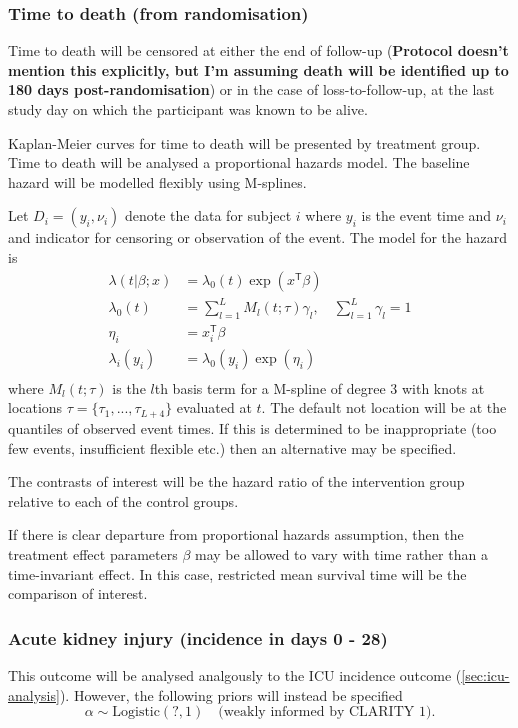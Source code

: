 \documentclass[11pt,parskip=half-]{scrartcl}
\begin{document}
\subsubsection{Time to death (from randomisation)}
Time to death will be censored at either the end of follow-up (\textbf{Protocol doesn't mention this explicitly, but I'm assuming death will be identified up to 180 days post-randomisation}) or in the case of loss-to-follow-up, at the last study day on which the participant was known to be alive.

Kaplan-Meier curves for time to death will be presented by treatment group. Time to death will be analysed a proportional hazards model. The baseline hazard will be modelled flexibly using M-splines.

Let $D_i = (y_i, \nu_i)$ denote the data for subject $i$ where $y_i$ is the event time and $\nu_i$ and indicator for censoring or observation of the event. The model for the hazard is
$$
    \begin{aligned}
        \lambda(t|\beta;x) & = \lambda_0(t)\exp(x^\mathsf{T}\beta)                           \\
        \lambda_0(t)       & = \sum_{l=1}^L M_l(t;\tau)\gamma_l,\quad \sum_{l=1}^L\gamma_l=1 \\
        \eta_i             & = x_i^\mathsf{T}\beta                                           \\
        \lambda_i(y_i)     & = \lambda_0(y_i)\exp(\eta_i)                                    \\
    \end{aligned}
$$
where $M_l(t;\tau)$ is the $l$th basis term for a M-spline of degree 3 with knots at locations $\tau=\{\tau_1,...,\tau_{L+4}\}$ evaluated at $t$. The default not location will be at the quantiles of observed event times. If this is determined to be inappropriate (too few events, insufficient flexible etc.) then an alternative may be specified.

The contrasts of interest will be the hazard ratio of the intervention group relative to each of the control groups.

If there is clear departure from proportional hazards assumption, then the treatment effect parameters $\beta$ may be allowed to vary with time rather than a time-invariant effect. In this case, restricted mean survival time will be the comparison of interest.

\subsubsection{Acute kidney injury (incidence in days 0 - 28)}
This outcome will be analysed analgously to the ICU incidence outcome (\ref{sec:icu-analysis}). However, the following priors will instead be specified
$$
    \alpha \sim \text{Logistic}(?, 1) \quad \text{(weakly informed by CLARITY 1)}.
$$
\end{document}
